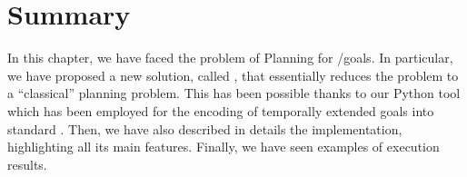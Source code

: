 \section{Summary}
In this chapter, we have faced the problem of \FOND Planning for \LTLf/\PLTL goals. In particular, we have proposed a new solution, called \FONDFOR, that essentially reduces the problem to a ``classical'' \FOND planning problem. This has been possible thanks to our \LTLfToDFA Python tool which has been employed for the encoding of temporally extended goals into standard \PDDL. Then, we have also described in details the \FONDFOR implementation, highlighting all its main features. Finally, we have seen examples of execution results.

